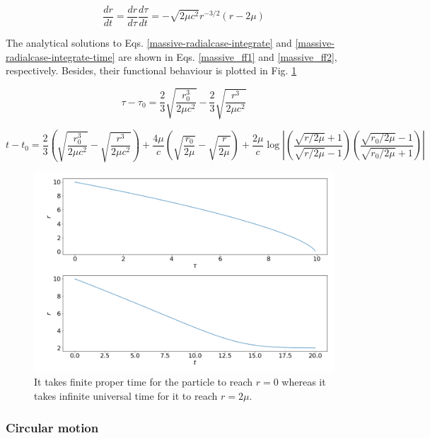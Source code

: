\documentclass[letterpaper,11pt,onecolumn]{article}
\begin{document}
\begin{equation} \label{massive-radialcase-integrate-time}
    \frac{dr}{dt} = \frac{dr}{d\tau} \frac{d\tau}{dt} = - \sqrt{2\mu c^2} r^{-3/2} (r - 2\mu)
\end{equation}

The analytical solutions to Eqs. \ref{massive-radialcase-integrate} and \ref{massive-radialcase-integrate-time} are shown in Eqs. \ref{massive_ff1} and \ref{massive_ff2}, respectively. Besides, their functional behaviour is plotted in Fig. \ref{fig:massive-ff}

\begin{equation} \label{massive_ff1}
    \tau - \tau_0 = \frac23 \sqrt{\frac{r_0^3}{2\mu c^2}} -  \frac23 \sqrt{\frac{r^3}{2\mu c^2}}
\end{equation}

\begin{equation} \label{massive_ff2}
    t - t_0 = \frac23 \left( \sqrt{\frac{r_0^3}{2\mu c^2}} - \sqrt{\frac{r^3}{2\mu c^2}} \right) + \frac{4 \mu}{c}  \left( \sqrt{\frac{r_0}{2\mu}} - \sqrt{\frac{r}{2\mu}} \right) + \frac{2\mu}{c} \log \left| \left( \frac{\sqrt{r/2\mu} + 1}{\sqrt{r/2\mu} - 1} \right) \left( \frac{\sqrt{r_0/2\mu} - 1}{\sqrt{r_0/2\mu} + 1} \right)  \right| 
\end{equation}


\begin{figure}[h!]
    \centering
    \includegraphics[width=0.8\linewidth]{Report/Images/2_radial_motion.png}
    \caption{It takes finite proper time for the particle to reach $r=0$ whereas it takes infinite universal time for it to reach $r = 2\mu$.}
    \label{fig:massive-ff}
\end{figure}


\subsubsection{Circular motion}
\end{document}
